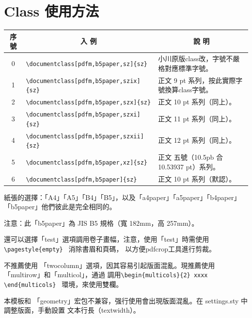 \section{Class 使用方法}

\begin{table}[H]
	\begin{center}
{\fontsize{10pt}{12}\selectfont\ttfamily
\begin{tabular}{|c|p{70mm}|p{75mm}|}
 \hline%
\multicolumn{1}{|c|}{序 號} & \multicolumn{1}{|c|}{入 例} & \multicolumn{1}{|c|}{說 明} \\ \hline %
0 & \verb+\documentclass[pdfm,b5paper,sz]{sz}+ & 小川原版class改，字號不嚴格對應標準字號。\\
1 & \verb+\documentclass[pdfm,b5paper,szix]{sz}+ & 正文 9 pt 系列，按此實際字號換算class字號。\\
2 & \verb+\documentclass[pdfm,b5paper,szx]{sz}+ & 正文 10 pt 系列（同上）。\\
3 & \verb+\documentclass[pdfm,b5paper,szxi]{sz}+ & 正文 11 pt 系列（同上）。\\
4 & \verb+\documentclass[pdfm,b5paper,szxii]{sz}+ & 正文 12 pt 系列（同上）。\\
5 & \verb+\documentclass[pdfm,b5paper,xz]{sz}+ & 正文 五號（10.5pb 合 10.53937 pt）系列。\\
6 & \verb+\documentclass[pdfm,b5paper]{sz}+ & 正文 10 pt 系列（默認）。\\
\hline%
\end{tabular} }
	\end{center}
\end{table}

\par 紙張的選擇：「A4」「A5」「B4」「B5」，以及「a4paper」「a5paper」「b4paper」「b5paper」他們彼此是完全相同的。
\par 注意：此「b5paper」為 JIS B5 規格（寬 182mm，高 257mm）。
\par 還可以選擇「test」選項調用卷子畫幅，注意，使用「test」時需使用 \verb+\pagestyle{empty} + 消除書眉和頁碼，
以方便pdfcrop工具進行剪裁。
\par 不推薦使用 「twocolumn」選項，因其容易引起版面混亂。現推薦使用 「multirow」和「multicol」，通過
調用{\verb+\begin{multicols}{2} xxxx \end{multicols} + } 環境，來使用雙欄。

\par 本模板和 「geometry」宏包不兼容，强行使用會出現版面混亂。在 settings.sty 中調整版面，手動設置
文本行長（textwidth）。

